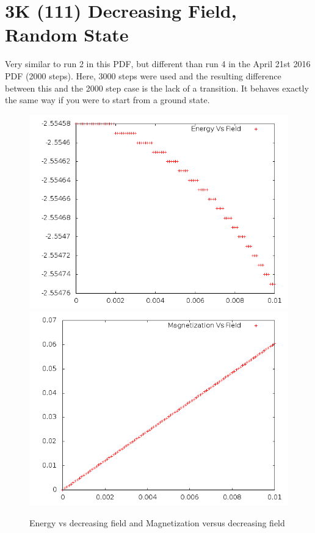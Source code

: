\documentclass{article}
\begin{document}
\section{3K (111) Decreasing Field, Random State}
Very similar to run 2 in this PDF, but different than run 4 in the April 21st 2016 PDF (2000 steps).
Here, 3000 steps were used and the resulting difference between this and the 2000 step case is the lack of a
transition. It behaves exactly the same way if you were to start from a ground state. 
\begin{figure}[h]
 \centering 
\includegraphics[scale=0.3]{111_3000/E005to000R.png}
\includegraphics[scale=0.3]{111_3000/M005to000R.png}
\caption{Energy vs decreasing field and Magnetization versus decreasing field}
\end{figure}
\end{document}
